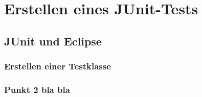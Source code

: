 %
%
\chapter{Erstellen eines JUnit-Tests}\label{ch:testerstellen}
	\section{JUnit und Eclipse}\label{s:junitundeclipse}
		\subsection{Erstellen einer Testklasse}\label{s:testklasseerstellen}
		\subsection{Punkt 2 bla bla}\label{s:label}